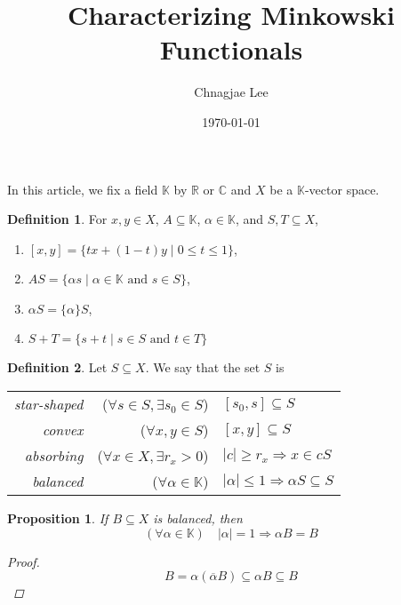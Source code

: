 \documentclass[a4paper,12pt]{article}
\title{Characterizing Minkowski Functionals}
\author{Chnagjae Lee}
\date{\today}
\theoremstyle{definition}
\newtheorem{definition}{Definition}
\theoremstyle{plain}
\newtheorem{proposition}{Proposition}
\theoremstyle{remark}
\begin{document}
\maketitle

In this article, we fix a field \(\mathbb{K}\) by \(\mathbb{R}\) or \(\mathbb{C}\) and \(X\) be a \(\mathbb{K}\)-vector space.

\begin{definition} For \(x,y \in X\), \(A \subseteq \mathbb{K}\), \(\alpha \in \mathbb{K}\), and \(S,T \subseteq X\),
    \begin{enumerate}
        \item \([x,y] = \{tx+(1-t)y \mid 0 \le t \le 1 \}\),
        \item \(AS = \{\alpha s \mid \alpha \in \mathbb{K} \mbox{ and } s \in S\}\),
        \item \(\alpha S = \{\alpha\}S\),
        \item \(S + T = \{s+t \mid s \in S \mbox{ and } t \in T\}\)
    \end{enumerate}
\end{definition}

\begin{definition} Let \(S\subseteq X \). We say that the set \(S\) is
    \begin{center}
        \begin{tabular}{r r l}
            \emph{star-shaped} & (\(\forall s \in S,\exists s_0 \in S\)) & \([s_0,s] \subseteq S \) \\
            \emph{convex} & (\(\forall x,y \in S\)) & \( [x,y] \subseteq S\) \\
            \emph{absorbing} & (\(\forall x \in X,\exists r_x>0\)) & \(\left \lvert c \right \rvert \ge r_x \Rightarrow x \in cS \) \\
            \emph{balanced} & (\(\forall \alpha \in \mathbb{K} \)) & \(\left \lvert \alpha \right \rvert \le 1 \Rightarrow \alpha S \subseteq S\) \\
        \end{tabular}
    \end{center}
\end{definition}

\begin{proposition}
    \label{balanced-unit}
    If \(B\subseteq X\) is balanced, then
    \[(\forall \alpha \in \mathbb{K})\quad |\alpha|=1 \Rightarrow \alpha B = B\]
    \begin{proof}
        \[B=\alpha(\overline{\alpha} B) \subseteq \alpha B \subseteq B \]
    \end{proof}
\end{proposition}
\end{document}
